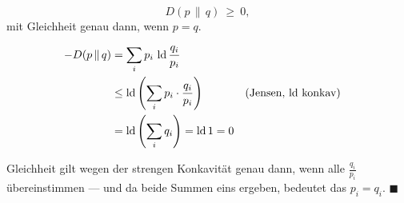 \begin{merksatz}
\[ D(p\,\|\,q) \ \ge\ 0 , \]
mit Gleichheit genau dann, wenn $p = q$.

\begin{align*}
-D(p\,\|\,q) &= \sum_i p_i\,\operatorname{ld}\frac{q_i}{p_i}\\
&\le \operatorname{ld}\left(\sum_i p_i\cdot\frac{q_i}{p_i}\right) && \text{(Jensen, $\operatorname{ld}$ konkav)}\\
&= \operatorname{ld}\left(\sum_i q_i\right) = \operatorname{ld} 1 = 0
\end{align*}

Gleichheit gilt wegen der strengen Konkavität genau dann, wenn alle $\frac{q_i}{p_i}$ übereinstimmen --- und da beide Summen eins ergeben, bedeutet das $p_i = q_i$. $\blacksquare$

\begin{center}
\begin{minipage}{0.88\textwidth}
\end{minipage}
\end{center}
\end{merksatz}

